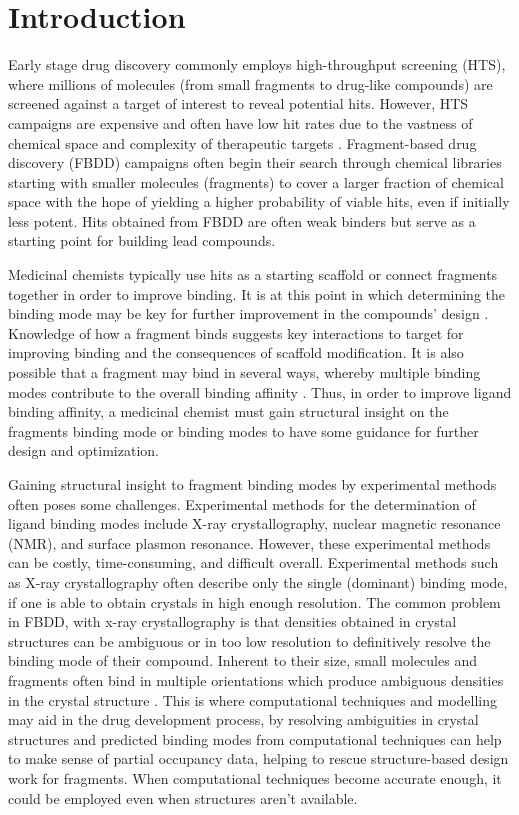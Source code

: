 \section{Introduction}
Early stage drug discovery commonly employs high-throughput screening (HTS), where millions of molecules (from small fragments to drug-like compounds) are screened against a target of interest to reveal potential hits.
However, HTS campaigns are expensive and often have low hit rates due to the vastness of chemical space and complexity of therapeutic targets \cite{erlanson_introduction_2012}.
Fragment-based drug discovery (FBDD) campaigns often begin their search through chemical libraries starting with smaller molecules (fragments) to cover a larger fraction of chemical space with the hope of yielding a higher probability of viable hits, even if initially less potent.
Hits obtained from FBDD are often weak binders but serve as a starting point for building lead compounds\cite{erlanson_tethering:_2004}.

Medicinal chemists typically use hits as a starting scaffold or connect fragments together in order to improve binding.
It is at this point in which determining the binding mode may be key for further improvement in the compounds' design \cite{gozalbes_contributions_2010}. 
Knowledge of how a fragment binds suggests key interactions to target for  improving binding and the consequences of scaffold modification.
It is also possible that a fragment may bind in several ways, whereby multiple binding modes contribute to the overall binding affinity \cite{stjernschantz_improved_2010}. 
Thus, in order to improve ligand binding affinity, a medicinal chemist must gain structural insight on the fragments binding mode or binding modes to have some guidance for further design and optimization.

Gaining structural insight to fragment binding modes by experimental methods often poses some challenges. 
Experimental methods for the determination of ligand binding modes include X-ray crystallography, nuclear magnetic resonance (NMR), and surface plasmon resonance.
However, these experimental methods can be costly, time-consuming, and difficult overall\cite{jhoti_fragment-based_2007, gozalbes_contributions_2010}.
Experimental methods such as X-ray crystallography often describe only the single (dominant) binding mode, if one is able to obtain crystals in high enough resolution.
The common problem in FBDD, with x-ray crystallography is that densities obtained in crystal structures can be ambiguous or in too low resolution to definitively resolve the binding mode of their compound.
Inherent to their size, small molecules and fragments often bind in multiple orientations which produce ambiguous densities in the crystal structure \cite{domagalski_quality_2014}.
This is where computational techniques and modelling may aid in the drug development process, by resolving ambiguities in crystal structures and predicted binding modes from computational techniques can help to make sense of partial occupancy data, helping to rescue structure-based design work for fragments.
When computational techniques become accurate enough, it could be employed even when structures aren't available\cite{erlanson_introduction_2012}.

